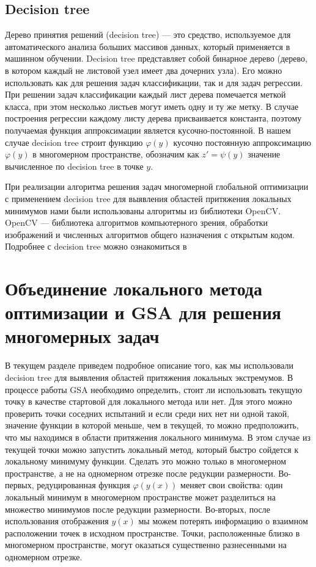 \documentclass{svproc}
\begin{document}
\subsection{Decision tree}\label{SecDT}

Дерево принятия решений (decision tree) --- это средство, используемое для автоматического анализа больших массивов данных, который применяется в машинном обучении. Decision tree представляет собой бинарное дерево (дерево, в котором каждый не листовой узел имеет два дочерних узла). Его можно использовать как для решения задач классификации, так и для задач регрессии. При решении задач классификации каждый лист дерева помечается меткой класса, при этом несколько листьев могут иметь одну и ту же метку. В случае построения регрессии каждому листу дерева присваивается константа, поэтому получаемая функция аппроксимации является кусочно-постоянной.
В нашем случае decision tree строит функцию $\varphi(y)$ кусочно постоянную аппроксимацию$\varphi(y)$  в многомерном пространстве, обозначим как $z' = \psi(y)$ значение вычисленное по decision tree в точке $y$.

При реализации алгоритма  решения задач многомерной глобальной оптимизации с применением decision tree для выявления областей притяжения локальных минимумов нами были использованы алгоритмы из библиотеки OpenCV. OpenCV --- библиотека алгоритмов компьютерного зрения, обработки изображений и численных алгоритмов общего назначения с открытым кодом. Подробнее с decision tree можно ознакомиться в \cite{fio_bib16}


\section{Объединение локального метода оптимизации и GSA для решения многомерных задач}\label{SecGSAL}

В текущем разделе приведем подробное описание того, как мы использовали decision tree для выявления областей притяжения локальных экстремумов. 
В процессе работы GSA необходимо определить, стоит ли использовать текущую точку в качестве стартовой для локального метода или нет. Для этого можно проверить точки соседних испытаний и если среди них нет ни одной такой, значение функции в которой меньше, чем в текущей, то можно предположить, что мы находимся в области притяжения локального минимума. В этом случае из текущей точки можно запустить локальный метод, который быстро сойдется к локальному минимуму функции. 
Сделать это можно только в многомерном пространстве, а не на одномерном отрезке после редукции размерности.  
Во-первых, редуцированная функция $\varphi(y(x))$ меняет свои свойства: один локальный минимум в многомерном пространстве может разделиться на множество минимумов после редукции размерности. Во-вторых, после использования отображения $y(x)$ мы можем потерять информацию о взаимном расположении точек в исходном пространстве. Точки, расположенные близко в многомерном пространстве, могут оказаться существенно разнесенными на одномерном отрезке.
\end{document}
